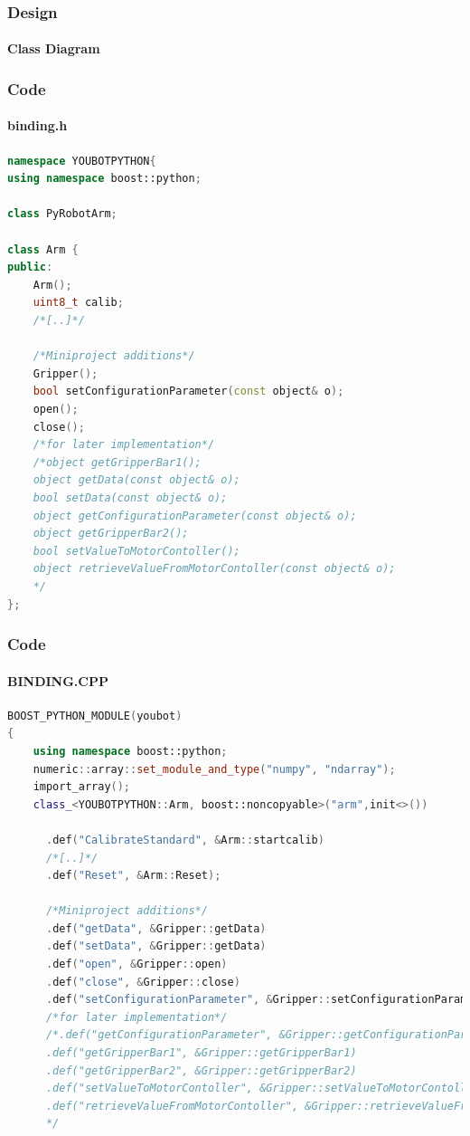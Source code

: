 \documentclass{beamer}
\begin{document}
\begin{frame}
 \frametitle{Design}
 \framesubtitle{Class Diagram}
  \begin{figure}[ht!]
  \centering
  \caption{}
  \label{overflow}
  \end{figure}
 
\end{frame}


\begin{frame}[fragile]
 \frametitle{Code}
 \framesubtitle{binding.h}
\begin{lstlisting}[language=C++]
namespace YOUBOTPYTHON{
using namespace boost::python;

class PyRobotArm;

class Arm {
public:
    Arm();
    uint8_t calib;
    /*[..]*/

    /*Miniproject additions*/
    Gripper();
    bool setConfigurationParameter(const object& o);
    open();
    close();
    /*for later implementation*/
    /*object getGripperBar1();
    object getData(const object& o);
    bool setData(const object& o);
    object getConfigurationParameter(const object& o);	
    object getGripperBar2();
    bool setValueToMotorContoller();
    object retrieveValueFromMotorContoller(const object& o);
    */
};
\end{lstlisting} 
\end{frame}

\begin{frame}[fragile]
 \frametitle{Code}
 \framesubtitle{BINDING.CPP}
\begin{lstlisting}[language=C++]
BOOST_PYTHON_MODULE(youbot)
{
    using namespace boost::python;
    numeric::array::set_module_and_type("numpy", "ndarray"); 
    import_array();
    class_<YOUBOTPYTHON::Arm, boost::noncopyable>("arm",init<>())

      .def("CalibrateStandard", &Arm::startcalib)
      /*[..]*/
      .def("Reset", &Arm::Reset);

      /*Miniproject additions*/
      .def("getData", &Gripper::getData)
      .def("setData", &Gripper::getData)
      .def("open", &Gripper::open)
      .def("close", &Gripper::close)
      .def("setConfigurationParameter", &Gripper::setConfigurationParameter)
      /*for later implementation*/
      /*.def("getConfigurationParameter", &Gripper::getConfigurationParameter)
      .def("getGripperBar1", &Gripper::getGripperBar1)
      .def("getGripperBar2", &Gripper::getGripperBar2)
      .def("setValueToMotorContoller", &Gripper::setValueToMotorContoller)
      .def("retrieveValueFromMotorContoller", &Gripper::retrieveValueFromMotorContoller)
      */
\end{lstlisting} 
\end{frame}


%         


\end{document}
